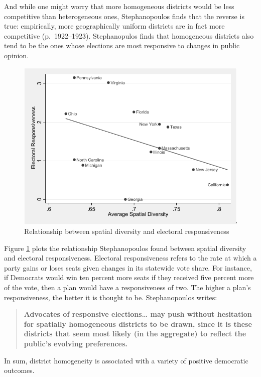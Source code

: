 \documentclass[]{article}
\begin{document}
And while one might worry that more homogeneous districts would be less
competitive than heterogeneous ones, Stephanopoulos finds that the
reverse is true: empirically, more geographically uniform districts are
in fact more competitive (p.~1922--1923). Stephanopulos finds that
homogeneous districts also tend to be the ones whose elections are most
responsive to changes in public opinion.

\begin{figure}
\centering
\includegraphics{./img/average_spatial-diversity.png}
\caption{Relationship between spatial diversity and electoral
responsiveness\label{sd_responsiveness}}
\end{figure}

Figure \ref{sd_responsiveness} plots the relationship Stephanopoulos
found between spatial diversity and electoral responsiveness. Electoral
responsiveness refers to the rate at which a party gains or loses seats
given changes in its statewide vote share. For instance, if Democrats
would win ten percent more seats if they received five percent more of
the vote, then a plan would have a responsiveness of two. The higher a
plan's responsiveness, the better it is thought to be. Stephanopoulos
writes:

\begin{quote}
\textbf{Advocates of responsive elections\ldots{} may push without
hesitation for spatially homogeneous districts to be drawn, since it is
these districts that seem most likely (in the aggregate) to reflect the
public's evolving preferences.}
\end{quote}

In sum, district homogeneity is associated with a variety of positive
democratic outcomes.
\end{document}
